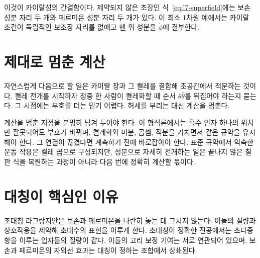 \begin{classroomqa}
\end{classroomqa}

이것이 카이랄성의 간결함이다. 제약되지 않은 초장인 식~\eqref{eq:l7-superfield}에는 보손 성분 자리 두 개와 페르미온 성분 자리 두 개가 있다. 이 최소 1차원 예에서는 카이랄 조건이 독립적인 보조장 자리를 없애고 맨 위 성분을 \(\dot\phi\)에 결부한다.

\section{제대로 멈춘 계산}

자연스럽게 다음으로 할 일은 카이랄 장과 그 켤레를 결합해 초공간에서 적분하는 것이다. 켤레 전개를 시작하자 청중 한 사람이 켤레화할 때 순서 \(\theta\bar\theta\)를 뒤집어야 하는지 묻는다. 그 시점에는 부호를 더는 믿기 어렵다. 허세를 부리는 대신 계산을 멈춘다.

\begin{classroomqa}
\end{classroomqa}

계산을 멈춘 지점을 분명히 남겨 두어야 한다. 이 형식론에서는 홀수 인자 하나의 위치만 잘못되어도 부호가 바뀌며, 켤레화와 미분, 곱셈, 적분을 거치면서 같은 규약을 유지해야 한다. 그 연결이 끊겼다면 계속하기 전에 바로잡아야 한다. 표준 규약에서 익숙한 운동 작용은 켤레 곱으로 구성되지만, 성분으로 자세히 전개하는 일은 끝나지 않은 칠판 식을 복원하는 과정이 아니라 다음 번에 정확히 계산할 몫이다.

\section{대칭이 핵심인 이유}

초대칭 라그랑지안은 보손과 페르미온을 나란히 놓는 데 그치지 않는다. 이들의 질량과 상호작용을 제약해 초대수의 표현을 이루게 한다. 초대칭이 정확한 진공에서는 초다중항을 이루는 입자들의 질량이 같다. 이들의 고리 보정 기여는 서로 연관되어 있으며, 보손과 페르미온의 자외선 효과는 대칭이 정하는 조합에서 상쇄된다.

